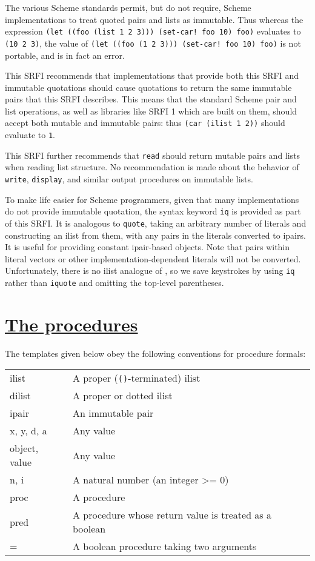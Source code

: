 The various Scheme standards permit, but do not require, Scheme
implementations to treat quoted pairs and lists as immutable. Thus
whereas the expression
\texttt{(let\ ((foo\ (list\ 1\ 2\ 3)))\ (set-car!\ foo\ 10)\ foo)}
evaluates to \texttt{(10\ 2\ 3)}, the value of
\texttt{(let\ ((foo\ \textquotesingle{}(1\ 2\ 3)))\ (set-car!\ foo\ 10)\ foo)}
is not portable, and is in fact an error.

This SRFI recommends that implementations that provide both this SRFI
and immutable quotations should cause quotations to return the same
immutable pairs that this SRFI describes. This means that the standard
Scheme pair and list operations, as well as libraries like SRFI 1 which
are built on them, should accept both mutable and immutable pairs: thus
\texttt{(car\ (ilist\ 1\ 2))} should evaluate to \texttt{1}.

This SRFI further recommends that \texttt{read} should return mutable
pairs and lists when reading list structure. No recommendation is made
about the behavior of \texttt{write}, \texttt{display}, and similar
output procedures on immutable lists.

To make life easier for Scheme programmers, given that many
implementations do not provide immutable quotation, the syntax keyword
\texttt{iq} is provided as part of this SRFI. It is analogous to
\texttt{quote}, taking an arbitrary number of literals and constructing
an ilist from them, with any pairs in the literals converted to ipairs.
It is useful for providing constant ipair-based objects. Note that pairs
within literal vectors or other implementation-dependent literals will
not be converted. Unfortunately, there is no ilist analogue of
\texttt{\textquotesingle{}}, so we save keystrokes by using \texttt{iq}
rather than \texttt{iquote} and omitting the top-level parentheses.

\section{\texorpdfstring{\href{}{The
procedures}}{The procedures}}\label{the-procedures}

The templates given below obey the following conventions for procedure
formals:

\begin{longtable}[]{@{}ll@{}}
\toprule
ilist & A proper (\texttt{()}-terminated) ilist\tabularnewline
dilist & A proper or dotted ilist\tabularnewline
ipair & An immutable pair\tabularnewline
x, y, d, a & Any value\tabularnewline
object, value & Any value\tabularnewline
n, i & A natural number (an integer \textgreater{}= 0)\tabularnewline
proc & A procedure\tabularnewline
pred & A procedure whose return value is treated as a
boolean\tabularnewline
= & A boolean procedure taking two arguments\tabularnewline
\bottomrule
\end{longtable}

